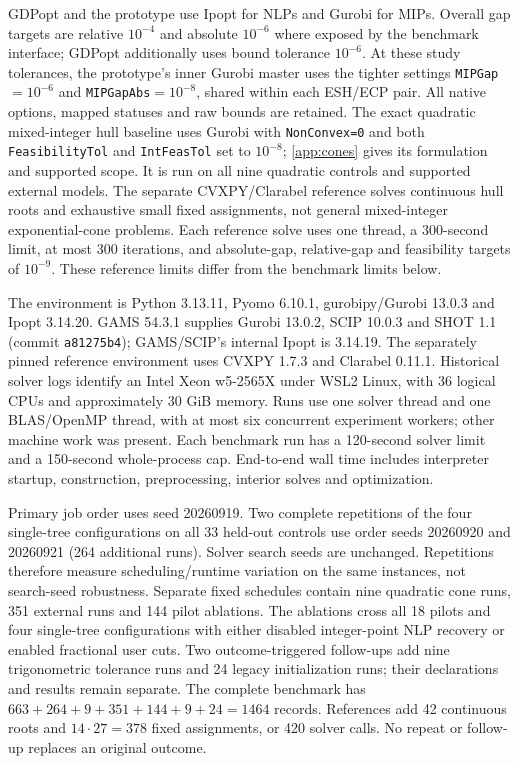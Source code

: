 GDPopt and the prototype use Ipopt \citep{ipopt} for NLPs and Gurobi for MIPs. Overall gap targets are relative $10^{-4}$ and absolute $10^{-6}$ where exposed by the benchmark interface; GDPopt additionally uses bound tolerance $10^{-6}$. At these study tolerances, the prototype's inner Gurobi master uses the tighter settings \texttt{MIPGap}$=10^{-6}$ and \texttt{MIPGapAbs}$=10^{-8}$, shared within each ESH/ECP pair. All native options, mapped statuses and raw bounds are retained. The exact quadratic mixed-integer hull baseline uses Gurobi with \texttt{NonConvex=0} and both \texttt{FeasibilityTol} and \texttt{IntFeasTol} set to $10^{-8}$; \cref{app:cones} gives its formulation and supported scope. It is run on all nine quadratic controls and supported external models. The separate CVXPY/Clarabel reference \citep{diamond2016,goulart2024} solves continuous hull roots and exhaustive small fixed assignments, not general mixed-integer exponential-cone problems. Each reference solve uses one thread, a 300-second limit, at most 300 iterations, and absolute-gap, relative-gap and feasibility targets of $10^{-9}$. These reference limits differ from the benchmark limits below.

The environment is Python 3.13.11, Pyomo 6.10.1, gurobipy/Gurobi 13.0.3 and Ipopt 3.14.20. GAMS 54.3.1 supplies Gurobi 13.0.2, SCIP 10.0.3 and SHOT 1.1 (commit \texttt{a81275b4}); GAMS/SCIP's internal Ipopt is 3.14.19. The separately pinned reference environment uses CVXPY 1.7.3 and Clarabel 0.11.1. Historical solver logs identify an Intel Xeon w5-2565X under WSL2 Linux, with 36 logical CPUs and approximately 30 GiB memory. Runs use one solver thread and one BLAS/OpenMP thread, with at most six concurrent experiment workers; other machine work was present. Each benchmark run has a 120-second solver limit and a 150-second whole-process cap. End-to-end wall time includes interpreter startup, construction, preprocessing, interior solves and optimization.

Primary job order uses seed 20260919. Two complete repetitions of the four single-tree configurations on all 33 held-out controls use order seeds 20260920 and 20260921 (264 additional runs). Solver search seeds are unchanged. Repetitions therefore measure scheduling/runtime variation on the same instances, not search-seed robustness. Separate fixed schedules contain nine quadratic cone runs, 351 external runs and 144 pilot ablations. The ablations cross all 18 pilots and four single-tree configurations with either disabled integer-point NLP recovery or enabled fractional user cuts. Two outcome-triggered follow-ups add nine trigonometric tolerance runs and 24 legacy initialization runs; their declarations and results remain separate. The complete benchmark has $663+264+9+351+144+9+24=1464$ records. References add 42 continuous roots and $14\cdot27=378$ fixed assignments, or 420 solver calls. No repeat or follow-up replaces an original outcome.

